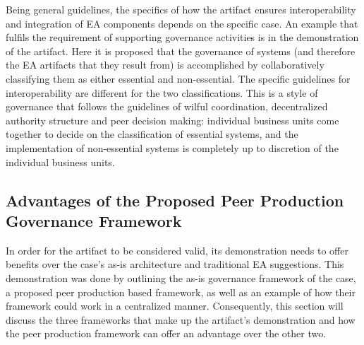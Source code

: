 Being general guidelines, the specifics of how the artifact ensures interoperability and integration of EA components depends on the specific case. An example that fulfils the requirement of supporting governance activities is in the demonstration of the artifact. Here it is proposed that the governance of systems (and therefore the EA artifacts that they result from) is accomplished by collaboratively classifying them as either essential and non-essential. The specific guidelines for interoperability are different for the two classifications. This is a style of governance that follows the guidelines of wilful coordination, decentralized authority structure and peer decision making: individual business units come together to decide on the classification of essential systems, and the implementation of non-essential systems is completely up to discretion of the individual business units. 

%
%
%
%  
%


\subsection{Advantages of the Proposed Peer Production Governance Framework}


In order for the artifact to be considered valid, its demonstration needs to offer benefits over the case's as-is architecture and traditional EA suggestions. This demonstration was done by outlining the as-is governance framework of the case, a proposed peer production based framework, as well as an example of how their framework could work in a centralized manner. Consequently, this section will discuss the three frameworks that make up the artifact's demonstration and how the peer production framework can offer an advantage over the other two. 


